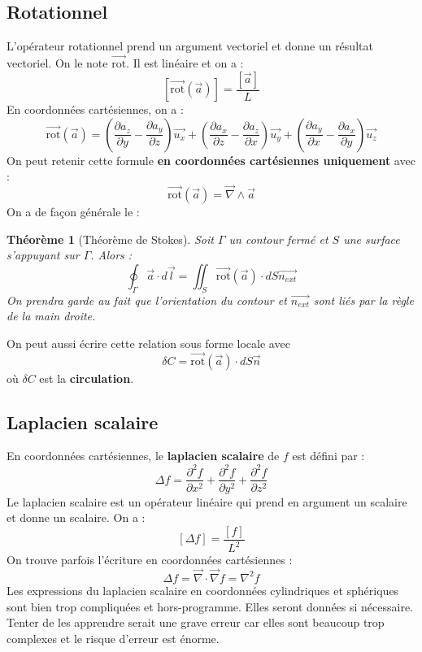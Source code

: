 \documentclass[french]{book}
\theoremstyle{plain}
\newtheorem{thm}{Théorème}
\theoremstyle{definition}
\theoremstyle{remark}
\newcommand{\rot}{\overrightarrow{\text{rot}}}
\begin{document}
\subsection{Rotationnel}
L'opérateur rotationnel prend un argument vectoriel et donne un résultat vectoriel. On le note $\rot$. Il est linéaire et on a : $$\left[\rot(\overrightarrow{a})\right]=\frac{[\overrightarrow{a}]}{L}$$
En coordonnées cartésiennes, on a : 
$$\rot(\overrightarrow{a})=\left(\frac{\partial a_z}{\partial y}-\frac{\partial a_y}{\partial z}\right)\overrightarrow{u_x}+\left(\frac{\partial a_x}{\partial z}-\frac{\partial a_z}{\partial x}\right)\overrightarrow{u_y}+\left(\frac{\partial a_y}{\partial x}-\frac{\partial a_x}{\partial y}\right)\overrightarrow{u_z}$$
On peut retenir cette formule \textbf{en coordonnées cartésiennes uniquement} avec : $$\rot(\overrightarrow{a})=\overrightarrow{\nabla}\wedge\overrightarrow{a}$$
On a de façon générale le :
\begin{thm}[Théorème de Stokes]
	Soit $\Gamma$ un contour fermé et $S$ une surface s'appuyant sur $\Gamma$. Alors : $$\oint_\Gamma \overrightarrow{a}\cdot d\overrightarrow{l}=\iint_S \rot(\overrightarrow{a})\cdot dS\overrightarrow{n_{ext}}$$ On prendra garde au fait que l'orientation du contour et $\overrightarrow{n_{ext}}$ sont liés par la règle de la main droite.
\end{thm}
On peut aussi écrire cette relation sous forme locale avec $$\delta C=\rot(\overrightarrow{a})\cdot dS\overrightarrow{n}$$ où $\delta C$ est la \textbf{circulation}.
\subsection{Laplacien scalaire}
En coordonnées cartésiennes, le \textbf{laplacien scalaire} de $f$ est défini par : $$\Delta f=\frac{\partial^2f}{\partial x^2}+\frac{\partial^2f}{\partial y^2}+\frac{\partial^2f}{\partial z^2}$$ Le laplacien scalaire est un opérateur linéaire qui prend en argument un scalaire et donne un scalaire. On a : $$\left[\Delta f\right]=\frac{[f]}{L^2}$$
On trouve parfois l'écriture en coordonnées cartésiennes : $$\Delta f=\overrightarrow{\nabla}\cdot\overrightarrow{\nabla}f=\nabla^2f$$
Les expressions du laplacien scalaire en coordonnées cylindriques et sphériques sont bien trop compliquées et hors-programme. Elles seront données si nécessaire. Tenter de les apprendre serait une grave erreur car elles sont beaucoup trop complexes et le risque d'erreur est énorme.
\end{document}

